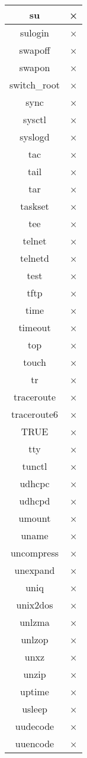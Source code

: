 \begin{longtable}{cc}
su & × \\ \hline
sulogin & × \\ \hline
swapoff & × \\ \hline
swapon & × \\ \hline
switch\_root & × \\ \hline
sync & × \\ \hline
sysctl & × \\ \hline
syslogd & × \\ \hline
tac & × \\ \hline
tail & × \\ \hline
tar & × \\ \hline
taskset & × \\ \hline
tee & × \\ \hline
telnet & × \\ \hline
telnetd & × \\ \hline
test & × \\ \hline
tftp & × \\ \hline
time & × \\ \hline
timeout & × \\ \hline
top & × \\ \hline
touch & × \\ \hline
tr & × \\ \hline
traceroute & × \\ \hline
traceroute6 & × \\ \hline
TRUE & × \\ \hline
tty & × \\ \hline
tunctl & × \\ \hline
udhcpc & × \\ \hline
udhcpd & × \\ \hline
umount & × \\ \hline
uname & × \\ \hline
uncompress & × \\ \hline
unexpand & × \\ \hline
uniq & × \\ \hline
unix2dos & × \\ \hline
unlzma & × \\ \hline
unlzop & × \\ \hline
unxz & × \\ \hline
unzip & × \\ \hline
uptime & × \\ \hline
usleep & × \\ \hline
uudecode & × \\ \hline
uuencode & × \\ \hline

\end{longtable}
